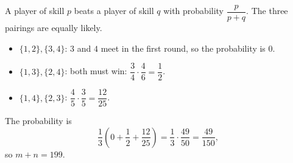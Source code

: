 A player of skill $p$ beats a player of skill $q$ with probability $\dfrac p{p+q}$. The three pairings are equally likely.
\begin{itemize}
\item $\{1,2\},\{3,4\}$: $3$ and $4$ meet in the first round, so the probability is $0$.
\item $\{1,3\},\{2,4\}$: both must win: $\dfrac34\cdot\dfrac46=\dfrac12$.
\item $\{1,4\},\{2,3\}$: $\dfrac45\cdot\dfrac35=\dfrac{12}{25}$.
\end{itemize}
The probability is
\[\dfrac13\left(0+\dfrac12+\dfrac{12}{25}\right)=\dfrac13\cdot\dfrac{49}{50}=\dfrac{49}{150},\]
so $m+n=\boxed{199}$.
